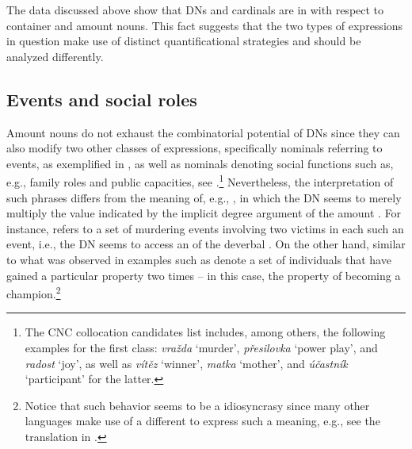 \documentclass[output=paper,modfonts,hidelinks,newtxmath
\ChapterDOI{10.5281/zenodo.2545513}
]{langscibook}
\begin{document}
\ea {}
\z \z

\noindent The data discussed above show that DNs and cardinals are in  with respect to container and amount nouns. This fact suggests that the two types of expressions in question make use of distinct quantificational strategies and should be analyzed differently.

\subsection{Events and social roles}\label{events-and-social-roles}

Amount nouns do not exhaust the combinatorial potential of  DNs since they can also modify two other classes of expressions, specifically nominals referring to events, as exemplified in , as well as nominals denoting social functions such as, e.g., family roles and public capacities, see .\footnote{The CNC collocation candidates list includes, among others, the following examples for the first class: \textit{vražda} `murder', \textit{přesilovka} `power play', and \textit{radost} `joy', as well as \textit{vítěz} `winner', \textit{matka} `mother', and \textit{účastník} `participant' for the latter.} Nevertheless, the interpretation of such phrases differs from the meaning of, e.g., , in which the DN seems to merely multiply the value indicated by the implicit degree argument of the amount . For instance,  refers to a set of murdering events involving two victims in each such an event, i.e., the DN seems to access an  of the deverbal . On the other hand, similar to what was observed in \citet{wagiel2015multiplicative} examples such as  denote a set of individuals that have gained a particular property two times -- in this case, the property of becoming a champion.\footnote{Notice that such behavior seems to be a  idiosyncrasy since many other languages make use of a different  to express such a meaning, e.g., see the  translation in .}
\end{document}

